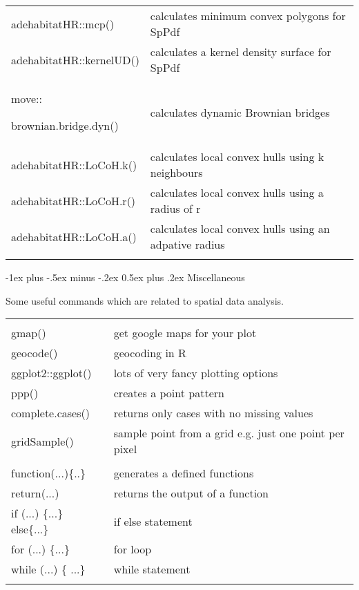 \documentclass[a4paper,10pt,landscape]{article}
\makeatletter
\renewcommand{\section}{\@startsection{section}{1}{0mm}%
                                {-1ex plus -.5ex minus -.2ex}%
                                {0.5ex plus .2ex}%
                                {\normalfont\large\bfseries}}
\makeatother
\begin{document}
\begin{multicols}{3}
\begin{tabular}{@{}p{\the\MyLen}%
                @{}p{\linewidth-\the\MyLen}@{}}
adehabitatHR::mcp() & calculates minimum convex polygons for SpPdf \\
adehabitatHR::kernelUD() & calculates a kernel density surface for SpPdf \\
move::\par brownian.bridge.dyn() & calculates dynamic Brownian bridges \\
adehabitatHR::LoCoH.k() & calculates local convex hulls using k neighbours \\
adehabitatHR::LoCoH.r() & calculates local convex hulls using a radius of r \\
adehabitatHR::LoCoH.a() & calculates local convex hulls using an adpative radius \\
& 

\end{tabular}




\section{Miscellaneous}

Some useful commands which are related to spatial data analysis.


\begin{tabular}{@{}p{\the\MyLen}%
                @{}p{\linewidth-\the\MyLen}@{}}
                & \\
gmap() & get google maps for your plot \\
geocode() & geocoding in R \\
ggplot2::ggplot() & lots of very fancy plotting options \\
ppp() & creates a point pattern \\

complete.cases() &  returns only cases with no missing values \\                
gridSample() & sample point from a grid e.g. just one point per pixel \\

 & \\
function(...)\{..\} & generates a defined functions\\
return(...) & returns the output of a function \\
if (...) \{...\} else\{...\} & if else statement \\
for (...) \{...\} & for loop \\
while (...) \{ ...\} & while statement \\
 & \\



\end{tabular}
\end{multicols}
\end{document}
